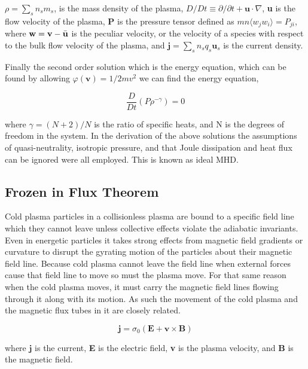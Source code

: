 \documentclass[utf8]{report}
\begin{document}
$\rho = \sum_{s} n_{s}m_{s}$, is the mass density of the plasma, $D/Dt \equiv \partial / \partial t + \textbf{u} \cdot \nabla$, \textbf{u} is the flow velocity of the plasma, $\textbf{P}$ is the pressure tensor defined as $mn\langle w_{j}w_{i} \rangle = P_{ji}$, where $\textbf{w} = \textbf{v} - \Bar{\textbf{u}}$ is the peculiar velocity, or the velocity of a species with respect to the bulk flow velocity of the plasma, and $\textbf{j} = \sum_{s} n_{s}q_{s}\textbf{u}_{s}$ is the current density. 

Finally the second order solution which is the energy equation, which can be found by allowing $\varphi(\textbf{v}) = 1/2 m v^{2}$ we can find the energy equation, 

\begin{equation}
    \frac{D}{Dt} (P\rho^{-\gamma}) = 0
    \label{eq:MHD.6}
\end{equation}

where $\gamma = (N+2)/N$ is the ratio of specific heats, and N is the degrees of freedom in the system. In the derivation of the above solutions the assumptions of quasi-neutrality, isotropic pressure, and that Joule dissipation and heat flux can be ignored were all employed. This is known as ideal MHD. 


\subsection{Frozen in Flux Theorem}  

Cold plasma particles in a collisionless plasma are bound to a specific field line which they cannot leave unless collective effects violate the adiabatic invariants. Even in energetic particles it takes strong effects from magnetic field gradients or curvature to disrupt the gyrating motion of the particles about their magnetic field line. Because cold plasma cannot leave the field line when external forces cause that field line to move so must the plasma move. For that same reason when the cold plasma moves, it must carry the magnetic field lines flowing through it along with its motion. As such the movement of the cold plasma and the magnetic flux tubes in it are closely related.

\begin{equation}
    \textbf{j} = \sigma_{0}(\textbf{E}+\textbf{v}\times\textbf{B})
    \label{eq:PP.1}
\end{equation}

where $\textbf{j}$ is the current, \textbf{E} is the electric field, \textbf{v} is the plasma velocity, and \textbf{B} is the magnetic field. 
\end{document}

